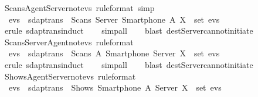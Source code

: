 \begin{isabellebody}
  \isamarkupfalse%
  \ Scans{\isacharunderscore}Agent{\isacharunderscore}Server{\isacharunderscore}not{\isacharunderscore}evs\ {\isacharbrackleft}rule{\isacharunderscore}format{\isacharcomma}\ simp{\isacharbrackright}\ {\isacharcolon}\isanewline
  \ \ {\isachardoublequoteopen}evs\ {\isasymin}\ sdaptrans\ {\isasymLongrightarrow}\ Scans\ Server\ {\isacharparenleft}Smartphone\ A{\isacharparenright}\ X\ {\isasymnotin}\ set\ evs{\isachardoublequoteclose}\isanewline
  \isadelimproof
  \isanewline
  \ \ %
  \endisadelimproof
  \isatagproof
  \isamarkupfalse%
  \ {\isacharparenleft}erule\ sdaptrans{\isachardot}induct{\isacharparenright}\isanewline
  \ \ \isamarkupfalse%
  \ {\isacharparenleft}simp{\isacharunderscore}all{\isacharparenright}\isanewline
  \ \ \isamarkupfalse%
  \ {\isacharparenleft}blast\ dest{\isacharcolon}Server{\isacharunderscore}cannot{\isacharunderscore}initiate{\isacharparenright}\isanewline
  \isamarkupfalse%
  \endisatagproof
  {\isafoldproof}%
  \isadelimproof
  \isanewline
  \endisadelimproof
  \isanewline
  \isamarkupfalse%
  \ Scans{\isacharunderscore}Server{\isacharunderscore}Agent{\isacharunderscore}not{\isacharunderscore}evs\ {\isacharbrackleft}rule{\isacharunderscore}format{\isacharbrackright}\ {\isacharcolon}\isanewline
  \ \ {\isachardoublequoteopen}evs\ {\isasymin}\ sdaptrans\ {\isasymLongrightarrow}\ Scans\ A\ {\isacharparenleft}Smartphone\ Server{\isacharparenright}\ X\ {\isasymnotin}\ set\ evs{\isachardoublequoteclose}\isanewline
  \isadelimproof
  \isanewline
  \ \ %
  \endisadelimproof
  \isatagproof
  \isamarkupfalse%
  \ {\isacharparenleft}erule\ sdaptrans{\isachardot}induct{\isacharparenright}\isanewline
  \ \ \isamarkupfalse%
  \ {\isacharparenleft}simp{\isacharunderscore}all{\isacharparenright}\isanewline
  \ \ \isamarkupfalse%
  \ {\isacharparenleft}blast\ dest{\isacharcolon}Server{\isacharunderscore}cannot{\isacharunderscore}initiate{\isacharparenright}{\isacharplus}\isanewline
  \isamarkupfalse%
  \endisatagproof
  {\isafoldproof}%
  \isadelimproof
  \isanewline
  \endisadelimproof
  \isanewline
  \isamarkupfalse%
  \ Shows{\isacharunderscore}Agent{\isacharunderscore}Server{\isacharunderscore}not{\isacharunderscore}evs\ {\isacharbrackleft}rule{\isacharunderscore}format{\isacharbrackright}\ {\isacharcolon}\isanewline
  \ \ {\isachardoublequoteopen}evs\ {\isasymin}\ sdaptrans\ {\isasymLongrightarrow}\ Shows\ {\isacharparenleft}Smartphone\ A{\isacharparenright}\ Server\ X\ {\isasymnotin}\ set\ evs{\isachardoublequoteclose}\isanewline

\end{isabellebody}
